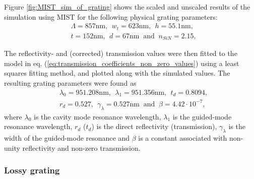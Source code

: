 Figure \ref{fig:MIST_sim_of_grating} shows the scaled and unscaled results of the simulation using MIST for the following physical grating parameters:
\begin{equation}
    \begin{split}
    &\Lambda = 857 \text{nm},\:\: w_t = 623 \text{nm},\:\: h = 55.1 \text{nm},\\ &t = 152 \text{nm},\:\: d = 67 \text{nm}\: \text{ and }\: n_{SiN} = 2.15,
    \end{split}
    \label{eq:physical_grating_params}
\end{equation}

The reflectivity- and (corrected) transmission values were then fitted to the model in eq. (\ref{eq:transmission_coefficients_non_zero_values}) using a least squares fitting method, and plotted along with the simulated values. The resulting grating parameters were found as
\begin{equation}
    \begin{split}
    &\lambda_0 = 951.208 \text{nm},\:\: \lambda_1 = 951.356 \text{nm},\:\: t_d = 0.8094,\\ &r_d = 0.527,\:\: \gamma_{\lambda} = 0.527 \text{nm}\: \text{ and }\: \beta = 4.42 \cdot 10^{-7},
    \end{split}
    \label{eq:optical_grating_params}
\end{equation}
where $\lambda_0$ is the cavity mode resonance wavelength, $\lambda_1$ is the guided-mode resonance wavelength, $r_d$ ($t_d$) is the direct reflectivity (transmission), $\gamma_{\lambda}$ is the width of the guided-mode resonance and $\beta$ is a constant associated with non-unity reflectivity and non-zero transmission. 

\subsubsection{Lossy grating}

